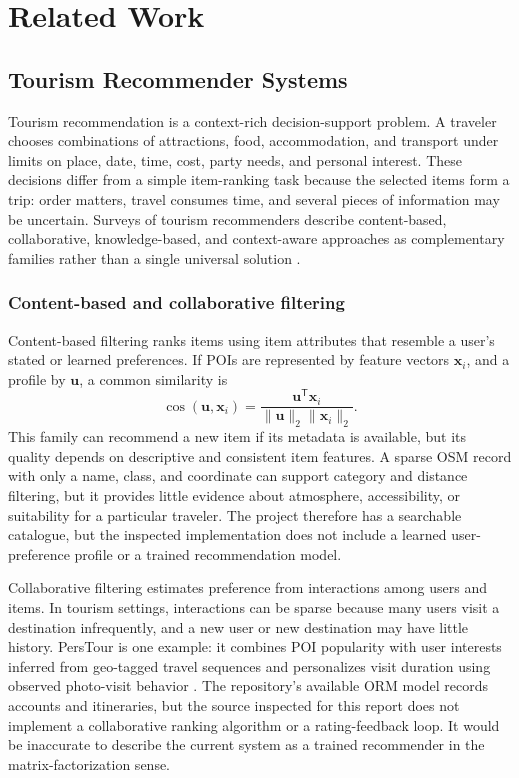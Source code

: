 \chapter{Related Work}
\label{chap:related_work}

\section{Tourism Recommender Systems}

Tourism recommendation is a context-rich decision-support problem. A traveler chooses combinations of attractions, food, accommodation, and transport under limits on place, date, time, cost, party needs, and personal interest. These decisions differ from a simple item-ranking task because the selected items form a trip: order matters, travel consumes time, and several pieces of information may be uncertain. Surveys of tourism recommenders describe content-based, collaborative, knowledge-based, and context-aware approaches as complementary families rather than a single universal solution \cite{borras2014intelligent,gavalas2014mobile}.

\subsection{Content-based and collaborative filtering}

Content-based filtering ranks items using item attributes that resemble a user's stated or learned preferences. If POIs are represented by feature vectors $\mathbf{x}_i$, and a profile by $\mathbf{u}$, a common similarity is
\begin{equation}
    \operatorname{cos}(\mathbf{u},\mathbf{x}_i)
    = \frac{\mathbf{u}^{\mathsf T}\mathbf{x}_i}
    {\lVert\mathbf{u}\rVert_2\lVert\mathbf{x}_i\rVert_2}.
\end{equation}
This family can recommend a new item if its metadata is available, but its quality depends on descriptive and consistent item features. A sparse OSM record with only a name, class, and coordinate can support category and distance filtering, but it provides little evidence about atmosphere, accessibility, or suitability for a particular traveler. The project therefore has a searchable catalogue, but the inspected implementation does not include a learned user-preference profile or a trained recommendation model.

Collaborative filtering estimates preference from interactions among users and items. In tourism settings, interactions can be sparse because many users visit a destination infrequently, and a new user or new destination may have little history. PersTour is one example: it combines POI popularity with user interests inferred from geo-tagged travel sequences and personalizes visit duration using observed photo-visit behavior \cite{lim2015persontour}. The repository's available ORM model records accounts and itineraries, but the source inspected for this report does not implement a collaborative ranking algorithm or a rating-feedback loop. It would be inaccurate to describe the current system as a trained recommender in the matrix-factorization sense.

